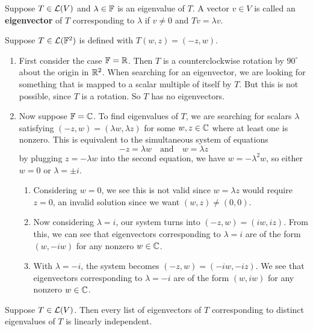 \begin{definition}[Eigenvector]
    Suppose $T\in\mathcal{L}(V)$ and $\lambda\in\mathbb F$ is an eigenvalue of $T$. A vector $v\in V$ is called an \textbf{eigenvector} of $T$ corresponding to $\lambda$ if $v\ne 0$ and $Tv=\lambda v$.
\end{definition}
\begin{example}
    Suppose $T\in\mathcal{L}(\mathbb F^2)$ is defined with $T(w,z) = (-z, w)$.
    \begin{enumerate}
        \item First consider the case $\mathbb F = \mathbb{R}$. Then $T$ is a counterclockwise rotation by $90^\circ$ about the origin in $\mathbb{R}^2$. When searching for an eigenvector, we are looking for something that is mapped to a scalar multiple of itself by $T$. But this is not possible, since $T$ is a rotation. So $T$ has no eigenvectors.
        \item Now suppose $\mathbb F=\mathbb{C}$. To find eigenvalues of $T$, we are searching for scalars $\lambda$ satisfying $(-z, w) = (\lambda w, \lambda z)$ for some $w,z \in \mathbb{C}$ where at least one is nonzero. This is equivalent to the simultaneous system of equations
        \[ -z = \lambda w \quad\text{and} \quad w = \lambda z \]
        by plugging $z = -\lambda w$ into the second equation, we have $w = -\lambda^2 w$, so either $w = 0$ or $\lambda = \pm i$.
        \begin{enumerate}
            \item Considering $w = 0$, we see this is not valid since $w = \lambda z$ would require $z=0$, an invalid solution since we want $(w,z)\ne (0,0)$.
            \item Now considering $\lambda = i$, our system turns into $(-z, w) = (iw, iz)$. From this, we can see that eigenvectors corresponding to $\lambda = i$ are of the form $(w, -iw)$ for any nonzero $w\in \mathbb{C}$.
            \item With $\lambda = -i$, the system becomes $(-z, w) = (-iw, -iz)$. We see that eigenvectors corresponding to $\lambda = -i$ are of the form $(w, iw)$ for any nonzero $w\in\mathbb{C}$.
        \end{enumerate}
    \end{enumerate}
\end{example}
\begin{theorem}
    Suppose $T\in\mathcal{L}(V)$. Then every list of eigenvectors of $T$ corresponding to distinct eigenvalues of $T$ is linearly independent.
\end{theorem}
